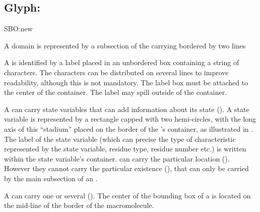 \color{red}

\subsection{Glyph: }
\label{sec:domain}

\begin{glyphDescription}

\glyphSboTerm SBO:new

\glyphContainer A domain is represented by a subsection of the carrying  bordered by two lines 

\glyphLabel A  is identified by a label placed in an unbordered box containing a string of characters.  The characters can be distributed on several lines to improve readability, although this is not mandatory.  The label box must be attached to the center of the container.  The label may spill outside of the container.

\glyphAux A  can carry state variables that can add information about its state ().  A state variable is represented by a rectangle capped with two hemi-circles, with the long axis of this  ``stadium'' placed on the border of the 's container, as illustrated in .  The label of the state variable (which can precise the type of characteristic represented by the state variable, residue type, residue number etc.) is written within the state variable's container.  can carry the particular  location (). However they cannot carry the particular  existence (), that can only be carried by the main subsection of an .

A  can carry one or several  (). The center of the bounding box of a  is located on the mid-line of the border of the macromolecule.

\end{glyphDescription}

